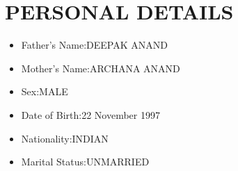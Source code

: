 \documentclass{article}
\begin{document}
\section{PERSONAL DETAILS}
\begin{itemize}
\item Father's Name:DEEPAK ANAND

\item Mother's Name:ARCHANA ANAND

\item Sex:MALE

\item Date of Birth:22 November 1997

\item Nationality:INDIAN

\item Marital Status:UNMARRIED
\end{itemize}
\end{document}
